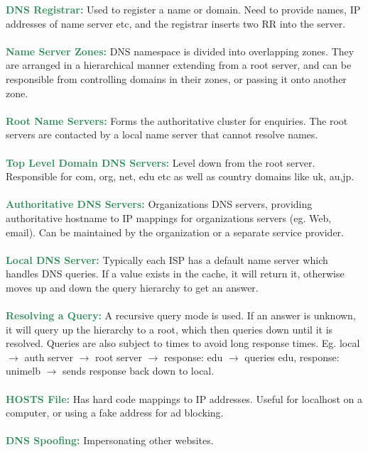 \documentclass[a4paper,10pt]{article}
\begin{document}
\textcolor{SeaGreen}{\textbf{DNS Registrar:}} Used to register a name or domain. Need to provide names, IP addresses of name server etc, and the registrar inserts two RR into the server. \\\\
\textcolor{SeaGreen}{\textbf{Name Server Zones:}} DNS namespace is divided into overlapping zones. They are arranged in a hierarchical manner extending from a root server, and can be responsible from controlling domains in their zones, or passing it onto another zone. \\\\
\noindent \textcolor{SeaGreen}{\textbf{Root Name Servers:}} Forms the authoritative cluster for enquiries. The root servers are contacted by a local name server that cannot resolve names. \\\\
\textcolor{SeaGreen}{\textbf{Top Level Domain DNS Servers:}} Level down from the root server. Responsible for com, org, net, edu etc as well as country domains like uk, au,jp. \\\\
\textcolor{SeaGreen}{\textbf{Authoritative DNS Servers:}} Organizations DNS servers, providing authoritative hostname to IP mappings for organizations servers (eg. Web, email). Can be maintained by the organization or a separate service provider. \\\\
\textcolor{SeaGreen}{\textbf{Local DNS Server:}} Typically each ISP has a default name server which handles DNS queries. If a value exists in the cache, it will return it, otherwise moves up and down the query hierarchy to get an answer. \\\\
\textcolor{SeaGreen}{\textbf{Resolving a Query:}} A recursive query mode is used. If an answer is unknown, it will query up the hierarchy to a root, which then queries down until it is resolved. Queries are also subject to times to avoid long response times. Eg. local $\rightarrow$ auth server $\rightarrow$ root server $\rightarrow$ response: edu $\rightarrow$ queries edu, response: unimelb $\rightarrow$ sends response back down to local. \\\\
\textcolor{SeaGreen}{\textbf{HOSTS File:}} Has hard code mappings to IP addresses. Useful for localhost on a computer, or using a fake address for ad blocking. \\\\
\textcolor{SeaGreen}{\textbf{DNS Spoofing:}} Impersonating other websites.\\\\
\end{document}
